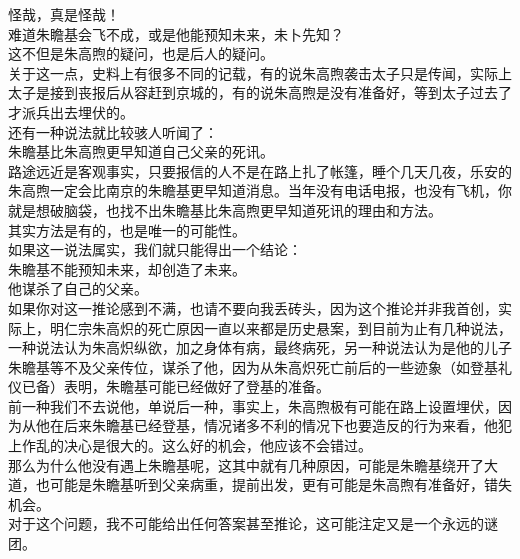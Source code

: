 \begin{multicols}{\theparacolNo}
怪哉，真是怪哉！\\

难道朱瞻基会飞不成，或是他能预知未来，未卜先知？\\

这不但是朱高煦的疑问，也是后人的疑问。\\

关于这一点，史料上有很多不同的记载，有的说朱高煦袭击太子只是传闻，实际上太子是接到丧报后从容赶到京城的，有的说朱高煦是没有准备好，等到太子过去了才派兵出去埋伏的。\\

还有一种说法就比较骇人听闻了：\\

朱瞻基比朱高煦更早知道自己父亲的死讯。\\

路途远近是客观事实，只要报信的人不是在路上扎了帐篷，睡个几天几夜，乐安的朱高煦一定会比南京的朱瞻基更早知道消息。当年没有电话电报，也没有飞机，你就是想破脑袋，也找不出朱瞻基比朱高煦更早知道死讯的理由和方法。\\

其实方法是有的，也是唯一的可能性。\\

如果这一说法属实，我们就只能得出一个结论：\\

朱瞻基不能预知未来，却创造了未来。\\

他谋杀了自己的父亲。\\

如果你对这一推论感到不满，也请不要向我丢砖头，因为这个推论并非我首创，实际上，明仁宗朱高炽的死亡原因一直以来都是历史悬案，到目前为止有几种说法，一种说法认为朱高炽纵欲，加之身体有病，最终病死，另一种说法认为是他的儿子朱瞻基等不及父亲传位，谋杀了他，因为从朱高炽死亡前后的一些迹象（如登基礼仪已备）表明，朱瞻基可能已经做好了登基的准备。\\

前一种我们不去说他，单说后一种，事实上，朱高煦极有可能在路上设置埋伏，因为从他在后来朱瞻基已经登基，情况诸多不利的情况下也要造反的行为来看，他犯上作乱的决心是很大的。这么好的机会，他应该不会错过。\\

那么为什么他没有遇上朱瞻基呢，这其中就有几种原因，可能是朱瞻基绕开了大道，也可能是朱瞻基听到父亲病重，提前出发，更有可能是朱高煦有准备好，错失机会。\\

对于这个问题，我不可能给出任何答案甚至推论，这可能注定又是一个永远的谜团。\\


\end{multicols}
